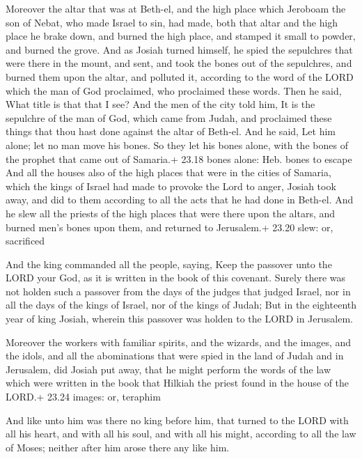  Moreover the altar that was at Beth-el, and the high
place which Jeroboam the son of Nebat, who made Israel to sin, had made,
both that altar and the high place he brake down, and burned the high
place, and stamped it small to powder, and burned the grove.
 And as Josiah turned himself, he spied the sepulchres that
were there in the mount, and sent, and took the bones out of the
sepulchres, and burned them upon the altar, and polluted it, according
to the word of the LORD which the man of God proclaimed, who proclaimed
these words.  Then he said, What title is that that I see?
And the men of the city told him, It is the sepulchre of the man of God,
which came from Judah, and proclaimed these things that thou hast done
against the altar of Beth-el.  And he said, Let him alone;
let no man move his bones. So they let his bones alone, with the bones
of the prophet that came out of Samaria.+ 23.18 bones alone: Heb. bones
to escape  And all the houses also of the high places that
were in the cities of Samaria, which the kings of Israel had made to
provoke the Lord to anger, Josiah took away, and did to them according
to all the acts that he had done in Beth-el.  And he slew
all the priests of the high places that were there upon the altars, and
burned men's bones upon them, and returned to Jerusalem.+ 23.20 slew:
or, sacrificed

 And the king commanded all the people, saying, Keep the
passover unto the LORD your God, as it is written in the book of this
covenant.  Surely there was not holden such a passover from
the days of the judges that judged Israel, nor in all the days of the
kings of Israel, nor of the kings of Judah;  But in the
eighteenth year of king Josiah, wherein this passover was holden to the
LORD in Jerusalem.

 Moreover the workers with familiar spirits, and the
wizards, and the images, and the idols, and all the abominations that
were spied in the land of Judah and in Jerusalem, did Josiah put away,
that he might perform the words of the law which were written in the
book that Hilkiah the priest found in the house of the LORD.+ 23.24
images: or, teraphim

 And like unto him was there no king before him, that
turned to the LORD with all his heart, and with all his soul, and with
all his might, according to all the law of Moses; neither after him
arose there any like him.

